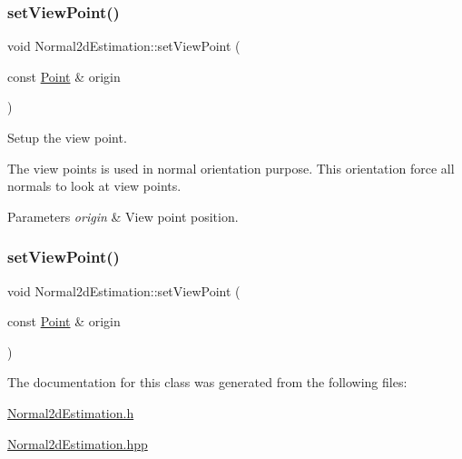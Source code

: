 \subsubsection{\texorpdfstring{set\+View\+Point()}{setViewPoint()}\hspace{0.1cm}{\footnotesize\ttfamily [1/2]}}
{\footnotesize\ttfamily void Normal2d\+Estimation\+::set\+View\+Point (\begin{DoxyParamCaption}\item[{const \hyperlink{Normal2dEstimation_8h_ab8d898f36957cca40634530a6f118a3e}{Point} \&}]{origin }\end{DoxyParamCaption})\hspace{0.3cm}{\ttfamily [inline]}}



Setup the view point. 

The view points is used in normal orientation purpose. This orientation force all normals to look at view points.


\begin{DoxyParams}{Parameters}
{\em origin} & View point position. \\
\hline
\end{DoxyParams}
\mbox{\label{classNormal2dEstimation_ad05b65f35c4aa0b1511bf81e5a70b36d}} 
\subsubsection{\texorpdfstring{set\+View\+Point()}{setViewPoint()}\hspace{0.1cm}{\footnotesize\ttfamily [2/2]}}
{\footnotesize\ttfamily void Normal2d\+Estimation\+::set\+View\+Point (\begin{DoxyParamCaption}\item[{const \hyperlink{Normal2dEstimation_8h_ab8d898f36957cca40634530a6f118a3e}{Point} \&}]{origin }\end{DoxyParamCaption})\hspace{0.3cm}{\ttfamily [inline]}}



The documentation for this class was generated from the following files\+:\begin{DoxyCompactItemize}
\item 
\hyperlink{Normal2dEstimation_8h}{Normal2d\+Estimation.\+h}\item 
\hyperlink{Normal2dEstimation_8hpp}{Normal2d\+Estimation.\+hpp}\end{DoxyCompactItemize}
